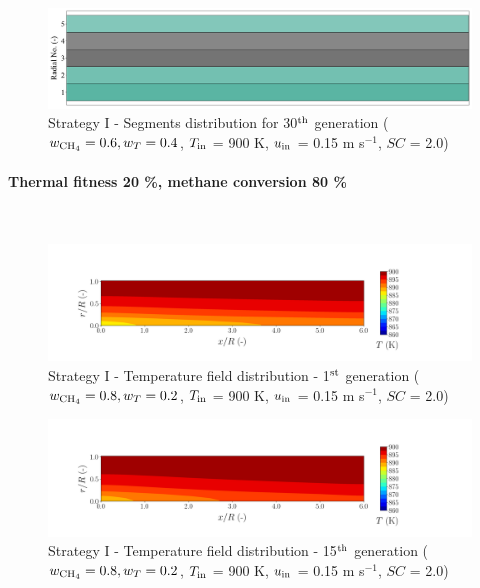 \documentclass[preprint,12pt]{elsarticle}
\begin{document}
\begin{figure}[h!]
\centering
\includegraphics[width=120mm]{results/segments/5seg/60C40T/seg.png}
\caption{\label{fig:30L6040G1-TField} Strategy I - Segments distribution for 30$^{\rm{th}}$ generation ($w_{\rm{CH_4}} = 0.6, w_T = 0.4$, $T_{\rm{in}}$ = 900 K, $u_{\rm{in}}$ = 0.15 m s$^{-1}$, $SC$ = 2.0)}
\end{figure}


\clearpage


\paragraph{Thermal fitness 20 \%, methane conversion 80 \%} \hspace{0pt} \\
\noindent 



\begin{figure}[h!]
\centering
\includegraphics[width=190mm]{results/5/80C_20T/GEN1-TFIELD.png}
\caption{\label{fig:5R8020G1-TField} Strategy I - Temperature field distribution - 1$^{\rm{st}}$ generation ($w_{\rm{CH_4}} = 0.8, w_T = 0.2$, $T_{\rm{in}}$ = 900 K, $u_{\rm{in}}$ = 0.15 m s$^{-1}$, $SC$ = 2.0)}
\end{figure}

\begin{figure}[h!]
\centering
\includegraphics[width=190mm]{results/5/80C_20T/GEN15-TFIELD.png}
\caption{\label{fig:5R8020G15-TField} Strategy I - Temperature field distribution - 15$^{\rm{th}}$ generation ($w_{\rm{CH_4}} = 0.8, w_T = 0.2$, $T_{\rm{in}}$ = 900 K, $u_{\rm{in}}$ = 0.15 m s$^{-1}$, $SC$ = 2.0)}
\end{figure}
\end{document}
